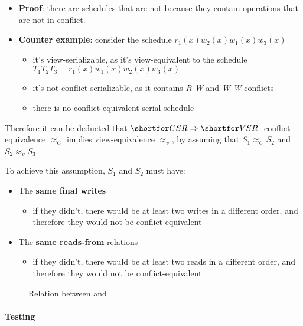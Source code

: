 \documentclass[english]{article}
\begin{document}
\begin{itemize}
  \item \textbf{Proof}: there are \vsr schedules that are not \csr because they contain operations that are not in conflict.
  \item \textbf{Counter example}: consider the schedule \(r_1(x) w_2(x) w_1(x) w_3(x)\)
        \begin{itemize}
          \item it's view-serializable, as it's view-equivalent to the schedule \(T_1 T_2 T_3 = r_1(x) w_1(x) w_2(x) w_3(x)\)
          \item it's not conflict-serializable, as it contains \textit{R-W} and \textit{W-W} conflicts
          \item there is no conflict-equivalent serial schedule
        \end{itemize}
\end{itemize}

\bigskip
Therefore it can be deducted that \(\csr \Rightarrow \vsr\): conflict-equivalence \(\approx_C\) implies view-equivalence \(\approx_v\), by assuming that \(S_1 \approx_C S_2\) and \(S_2 \approx_v S_3\).

To achieve this assumption, \(S_1\) and \(S_2\) must have:

\begin{itemize}
  \item The \textbf{same final writes}
        \begin{itemize}
          \item if they didn't, there would be at least two writes in a different order, and therefore they would not be conflict-equivalent
        \end{itemize}
  \item The \textbf{same reads-from} relations
        \begin{itemize}
          \item if they didn't, there would be at least two reads in a different order, and therefore they would not be conflict-equivalent
        \end{itemize}
\end{itemize}

\begin{figure}[htbp]
  \bigskip
  \centering
  \caption{Relation between \vsr and \csr}
  \label{fig:relation-between-vsr-and-csr}
  \bigskip
\end{figure}

\paragraph{Testing \csr}
\end{document}
